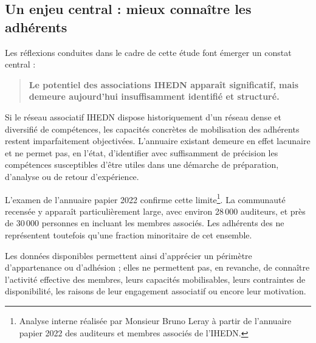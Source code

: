 \subsection{Un enjeu central : mieux connaître les adhérents}

Les réflexions conduites dans le cadre de cette étude font émerger un constat central :

\begin{quote}
\textbf{Le potentiel des associations IHEDN apparaît significatif, mais demeure aujourd'hui insuffisamment identifié et structuré.}
\end{quote}

Si le réseau associatif IHEDN dispose historiquement d'un réseau dense et diversifié de compétences, les capacités concrètes de mobilisation des adhérents restent imparfaitement objectivées. L'annuaire existant demeure en effet lacunaire et ne permet pas, en l'état, d'identifier avec suffisamment de précision les compétences susceptibles d'être utiles dans une démarche de préparation, d'analyse ou de retour d'expérience.

L'examen de l'annuaire papier 2022 confirme cette limite\footnote{Analyse interne réalisée par Monsieur Bruno Leray à partir de l'annuaire papier 2022 des auditeurs et membres associés de l'IHEDN.}. La communauté recensée y apparaît particulièrement large, avec environ 28\,000 auditeurs, et près de 30\,000 personnes en incluant les membres associés. Les adhérents des \AssociationsUnionIHEDN{} ne représentent toutefois qu'une fraction minoritaire de cet ensemble.

Les données disponibles permettent ainsi d'apprécier un périmètre d'appartenance ou d'adhésion ; elles ne permettent pas, en revanche, de connaître l'activité effective des membres, leurs capacités mobilisables, leurs contraintes de disponibilité, les raisons de leur engagement associatif ou encore leur motivation.

